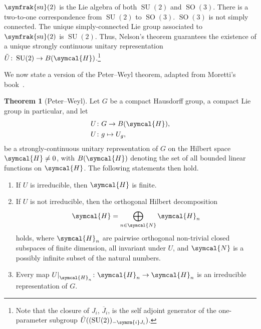 \documentclass[12pt, a4 paper]{article}
\theoremstyle{definition}
\newtheorem{thm}{Theorem}
\newcommand{\hilbert}{\symcal{H}}
\renewcommand{\i}{\symrm{i}}
\newcommand{\sutwo}{\operatorname{\symfrak{su}}(2)}
\newcommand{\SUtwo}{\operatorname{SU}(2)}
\newcommand{\SOthree}{\operatorname{SO}(3)}
\newcommand\restr[2]{{%
        \left.\kern-\nulldelimiterspace %
        #1 %
        \littletaller %
        \right|_{#2} %
    }}
\newcommand{\littletaller}{\mathchoice{\vphantom{\big|}}{}{}{}}
\begin{document}
    \(\sutwo\) is the Lie algebra of both \(\SUtwo\) and \(\SOthree\). There is a two-to-one correspondence from \(\SUtwo\) to \(\SOthree\). \(\SOthree\) is not simply connected. The unique simply-connected Lie group associated to \(\sutwo\) is \(\SUtwo\). Thus, Nelson's theorem guarantees the existence of a unique strongly continuous unitary representation \(\tilde{U} \colon \SUtwo \rightarrow B(\hilbert)\).\footnote{Note that the closure of \(J_i\), \(\overline{J}_i\), is the self adjoint generator of the one-parameter subgroup \( \tilde{U}( (\SUtwo)_{-\i J_i}) \).}

    We now state a version of the Peter--Weyl theorem, adapted from Moretti's book~\cite[p.~287]{MorettiFundamental}.
    \begin{thm}[Peter--Weyl]
        Let \(G\) be a compact Hausdorff group, a compact Lie group in particular, and let
        \begin{align*}
            U &\colon G \rightarrow B(\hilbert),\\
            U &\colon g \mapsto U_g,
        \end{align*}
        be a strongly-continuous unitary representation of $G$ on the Hilbert space $\hilbert \neq 0$, with $B(\hilbert)$ denoting the set of all bounded linear functions on $\hilbert$. The following statements then hold.
        \begin{enumerate}
            \item If \(U\) is irreducible, then \(\hilbert\) is finite.
            \item If \(U\) is not irreducible, then the orthogonal Hilbert decomposition
            \[
                \hilbert = \bigoplus_{n\in \symcal{N}} \hilbert_n
            \]
            holds, where \(\hilbert_n\) are pairwise orthogonal non-trivial closed subspaces of finite dimension, all invariant under \(U\), and \(\symcal{N}\) is a possibly infinite subset of the natural numbers.
            \item Every map \(\restr{U}{\hilbert_n} \colon \hilbert_n \rightarrow \hilbert_n\) is an irreducible representation of \(G\).
        \end{enumerate}
    \end{thm}
\end{document}
